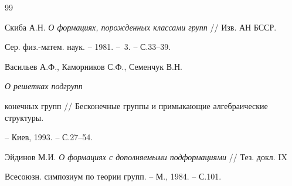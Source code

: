 \begin{thebibliography}{99}
 




Скиба А.Н. {\em О формациях, порожденных классами групп} // Изв. АН БССР. 


Сер. физ.-матем. наук. -- 1981. -- \No\,3. -- С.33--39. 


 




Васильев А.Ф., Каморников С.Ф., Семенчук В.Н. {\em О решетках подгрупп 


конечных групп // Бесконечные группы и примыкающие алгебраические структуры.} 


-- Киев, 1993. -- С.27--54. 


 




Эйдинов М.И. {\em О формациях с дополняемыми подформациями} // Тез. докл. IX 


Всесоюзн. симпозиум по теории групп. -- М., 1984. -- С.101. 


 


\end{thebibliography} 


 


\vskip 2cm 


 






 


 


